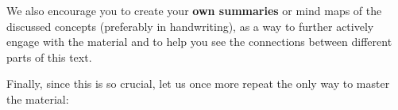We also encourage you to create your \textbf{own summaries} or mind maps of the discussed concepts (preferably in handwriting), as a way to further actively engage with the material and to help you see the connections between different parts of this text.

Finally, since this is so crucial, let us once more repeat the only way to master the material:
\\



